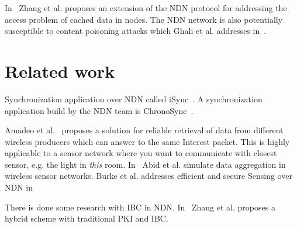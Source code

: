 In~\cite{DBLP:journals/tifs/LiZZSF15} Zhang et al. proposes an extension of the \gls{NDN} protocol for addressing the access problem of cached data in nodes.  
The \gls{NDN} network is also potentially susceptible to content poisoning attacks which Ghali et al. addresses in~\cite{DBLP:journals/ccr/GhaliTU14}.

\section{Related work}
Synchronization application over \gls{NDN} called iSync~\cite{DBLP:conf/acmicn/FuAC14}.
A synchronization application build by the \gls{NDN} team is ChronoSync~\cite{DBLP:conf/icnp/ZhuA13}.

Amadeo et al.~\cite{DBLP:conf/acmicn/AmadeoCM14} proposes a solution for reliable retrieval of data from different wireless producers which can answer to the same Interest packet. This is highly applicable to a sensor network where you want to communicate with closest sensor, e.g. the light in \textit{this} room.
In~\cite{DBLP:conf/noms/AbidySLF14} Abid et al. simulate data aggregation in wireless sensor networks.
Burke et al. addresses efficient and secure Sensing over \gls{NDN} in~\cite{DBLP:conf/nca/BurkeGNT14}

There is done some research with \gls{IBC} in \gls{NDN}. In~\cite{DBLP:conf/icnp/ZhangCXWSW11} Zhang et al. proposes a hybrid scheme with traditional \gls{PKI} and \gls{IBC}.